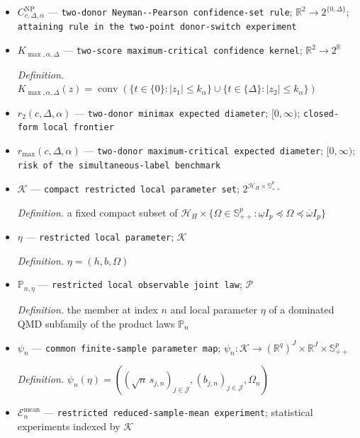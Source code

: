 \documentclass{article}
\begin{document}
\begin{itemize}
  \item \(C^{\mathrm{NP}}_{c,\Delta,\alpha}\) --- \texttt{two-\allowbreak{}donor Neyman-\allowbreak{}-\allowbreak{}Pearson confidence-\allowbreak{}set rule}; \(\mathbb R^2\to2^{\{0,\Delta\}}\); \texttt{attaining rule in the two-\allowbreak{}point donor-\allowbreak{}switch experiment}
  \item \(K_{\max,\alpha,\Delta}\) --- \texttt{two-\allowbreak{}score maximum-\allowbreak{}critical confidence kernel}; \(\mathbb R^2\to2^{\mathbb R}\)
  \par\smallskip\noindent\emph{Definition.} \(K_{\max,\alpha,\Delta}(z)=\operatorname{conv}(\{t\in\{0\}:|z_1|\le k_{\alpha}\}\cup\{t\in\{\Delta\}:|z_2|\le k_{\alpha}\})\)
  \item \(r_2(c,\Delta,\alpha)\) --- \texttt{two-\allowbreak{}donor minimax expected diameter}; \([0,\infty)\); \texttt{closed-\allowbreak{}form local frontier}
  \item \(r_{\max}(c,\Delta,\alpha)\) --- \texttt{two-\allowbreak{}donor maximum-\allowbreak{}critical expected diameter}; \([0,\infty)\); \texttt{risk of the simultaneous-\allowbreak{}label benchmark}
  \item \(\mathcal K\) --- \texttt{compact restricted local parameter set}; \(2^{\mathcal H_H\times\mathbb S_{++}^p}\)
  \par\smallskip\noindent\emph{Definition.} a fixed compact subset of \(\mathcal H_H\times\{\Omega\in\mathbb S_{++}^p:\underline\omega I_p\preceq\Omega\preceq\overline\omega I_p\}\)
  \item \(\eta\) --- \texttt{restricted local parameter}; \(\mathcal K\)
  \par\smallskip\noindent\emph{Definition.} \(\eta=(h,b,\Omega)\)
  \item \(\mathbb P_{n,\eta}\) --- \texttt{restricted local observable joint law}; \(\mathcal P\)
  \par\smallskip\noindent\emph{Definition.} the member at index \(n\) and local parameter \(\eta\) of a dominated QMD subfamily of the product laws \(\mathbb P_n\)
  \item \(\psi_n\) --- \texttt{common finite-\allowbreak{}sample parameter map}; \(\psi_n:\mathcal K\to(\mathbb R^q)^J\times\mathbb R^J\times\mathbb S_{++}^p\)
  \par\smallskip\noindent\emph{Definition.} \(\psi_n(\eta)=((\sqrt n\,s_{j,n})_{j\in\mathcal J},(b_{j,n})_{j\in\mathcal J},\Omega_n)\)
  \item \(\mathcal E_n^{\mathrm{mean}}\) --- \texttt{restricted reduced-\allowbreak{}sample-\allowbreak{}mean experiment}; statistical experiments indexed by \(\mathcal K\)

\end{itemize}
\end{document}
